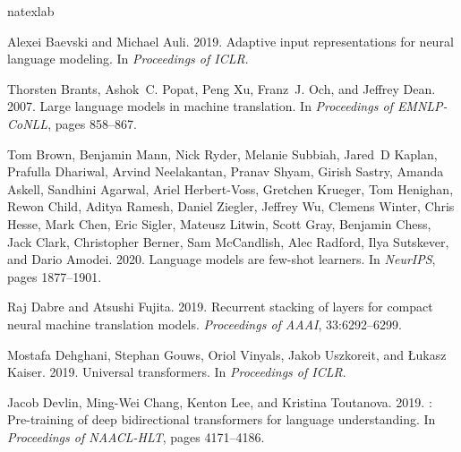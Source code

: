 \documentclass[11pt]{article}
\begin{document}

\begin{thebibliography}{37}
\expandafter\ifx\csname natexlab\endcsname\relax\def\natexlab#1{#1}\fi

Alexei Baevski and Michael Auli. 2019.
\newblock Adaptive input representations for neural language modeling.
\newblock In \emph{Proceedings of ICLR}.

Thorsten Brants, Ashok~C. Popat, Peng Xu, Franz~J. Och, and Jeffrey Dean. 2007.
\newblock Large language models in machine translation.
\newblock In \emph{Proceedings of {EMNLP}-{C}o{NLL}}, pages 858--867.

Tom Brown, Benjamin Mann, Nick Ryder, Melanie Subbiah, Jared~D Kaplan, Prafulla
  Dhariwal, Arvind Neelakantan, Pranav Shyam, Girish Sastry, Amanda Askell,
  Sandhini Agarwal, Ariel Herbert-Voss, Gretchen Krueger, Tom Henighan, Rewon
  Child, Aditya Ramesh, Daniel Ziegler, Jeffrey Wu, Clemens Winter, Chris
  Hesse, Mark Chen, Eric Sigler, Mateusz Litwin, Scott Gray, Benjamin Chess,
  Jack Clark, Christopher Berner, Sam McCandlish, Alec Radford, Ilya Sutskever,
  and Dario Amodei. 2020.
\newblock Language models are few-shot learners.
\newblock In \emph{NeurIPS}, pages 1877--1901.

Raj Dabre and Atsushi Fujita. 2019.
\newblock Recurrent stacking of layers for compact neural machine translation
  models.
\newblock \emph{Proceedings of AAAI}, 33:6292--6299.

Mostafa Dehghani, Stephan Gouws, Oriol Vinyals, Jakob Uszkoreit, and Łukasz
  Kaiser. 2019.
\newblock Universal transformers.
\newblock In \emph{Proceedings of ICLR}.

Jacob Devlin, Ming-Wei Chang, Kenton Lee, and Kristina Toutanova. 2019.
: Pre-training of deep bidirectional transformers for language
  understanding.
\newblock In \emph{Proceedings of NAACL-HLT}, pages 4171--4186.


\end{thebibliography}
\end{document}
